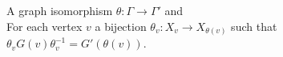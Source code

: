 \documentclass[preview]{standalone}
\begin{document}
A graph isomorphism $\theta : \Gamma \to \Gamma'$ and\\For each vertex $v$ a bijection $\theta_v : X_v \to X_{\theta(v)}$ such that $\theta_v G(v)\theta_v^{-1} = G'(\theta(v))$.\\
\end{document}

